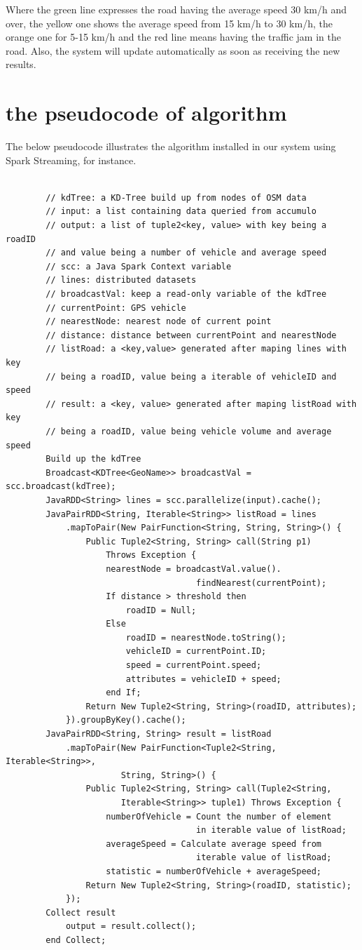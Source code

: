 \documentclass{acm_proc_article-sp}
\begin{document}
Where the green line expresses the road having the average speed 30 km/h and over, the yellow one shows the average speed from 15 km/h to 30 km/h, the orange one for 5-15 km/h and the red line means having the traffic jam in the road. Also, the system will update automatically as soon as receiving the new results.

\section{the pseudocode of algorithm} 
\medskip
\noindent
The below pseudocode illustrates the algorithm installed in our system using Spark Streaming, for instance.

\begin{verbatim}
		
		// kdTree: a KD-Tree build up from nodes of OSM data
		// input: a list containing data queried from accumulo
		// output: a list of tuple2<key, value> with key being a roadID 
		// and value being a number of vehicle and average speed
		// scc: a Java Spark Context variable
		// lines: distributed datasets
		// broadcastVal: keep a read-only variable of the kdTree
		// currentPoint: GPS vehicle 
		// nearestNode: nearest node of current point
		// distance: distance between currentPoint and nearestNode
		// listRoad: a <key,value> generated after maping lines with key
		// being a roadID, value being a iterable of vehicleID and speed
		// result: a <key, value> generated after maping listRoad with key 
		// being a roadID, value being vehicle volume and average speed
		Build up the kdTree
		Broadcast<KDTree<GeoName>> broadcastVal = scc.broadcast(kdTree);
		JavaRDD<String> lines = scc.parallelize(input).cache();
		JavaPairRDD<String, Iterable<String>> listRoad = lines
		    .mapToPair(New PairFunction<String, String, String>() {
		        Public Tuple2<String, String> call(String p1) 
		            Throws Exception {
		            nearestNode = broadcastVal.value().
		                              findNearest(currentPoint);	
		            If distance > threshold then
		                roadID = Null;
		            Else 
		                roadID = nearestNode.toString();
		                vehicleID = currentPoint.ID;
		                speed = currentPoint.speed;
		                attributes = vehicleID + speed;
		            end If;
		        Return New Tuple2<String, String>(roadID, attributes);
		    }).groupByKey().cache();
		JavaPairRDD<String, String> result = listRoad
		    .mapToPair(New PairFunction<Tuple2<String, Iterable<String>>, 
		               String, String>() {
		        Public Tuple2<String, String> call(Tuple2<String,
		               Iterable<String>> tuple1) Throws Exception {
		            numberOfVehicle = Count the number of element
		                              in iterable value of listRoad;
		            averageSpeed = Calculate average speed from
		                              iterable value of listRoad;
		            statistic = numberOfVehicle + averageSpeed;
		        Return New Tuple2<String, String>(roadID, statistic);
		    });
		Collect result
		    output = result.collect();
		end Collect;

\end{verbatim}
%
\noindent
\end{document}
